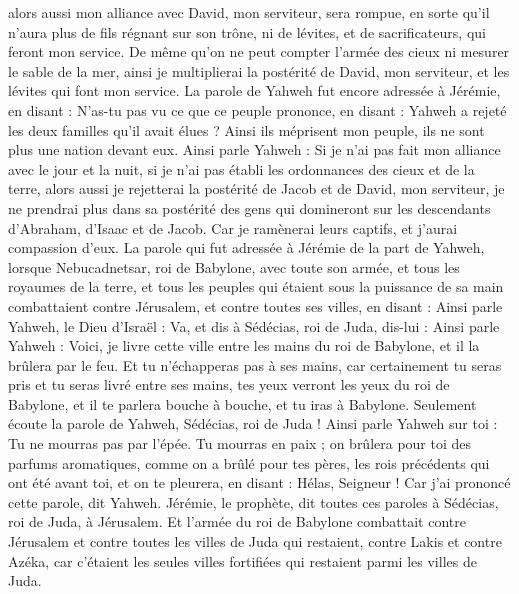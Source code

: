 \begin{multicols}{2}
alors aussi mon alliance avec David, mon serviteur, sera rompue, en sorte qu'il n'aura plus de fils régnant sur son trône, ni de lévites, et de sacrificateurs, qui feront mon service.
De même qu’on ne peut compter l'armée des cieux ni mesurer le sable de la mer, ainsi je multiplierai la postérité de David, mon serviteur, et les lévites qui font mon service.
La parole de Yahweh fut encore adressée à Jérémie, en disant :
N'as-tu pas vu ce que ce peuple prononce, en disant : Yahweh a rejeté les deux familles qu'il avait élues ? Ainsi ils méprisent mon peuple, ils ne sont plus une nation devant eux.
Ainsi parle Yahweh : Si je n'ai pas fait mon alliance avec le jour et la nuit, si je n'ai pas établi les ordonnances des cieux et de la terre,
alors aussi je rejetterai la postérité de Jacob et de David, mon serviteur, je ne prendrai plus dans sa postérité des gens qui domineront sur les descendants d'Abraham, d'Isaac et de Jacob. Car je ramènerai leurs captifs, et j'aurai compassion d'eux.
\VerseOne{}La parole qui fut adressée à Jérémie de la part de Yahweh, lorsque Nebucadnetsar, roi de Babylone, avec toute son armée, et tous les royaumes de la terre, et tous les peuples qui étaient sous la puissance de sa main combattaient contre Jérusalem, et contre toutes ses villes, en disant :
Ainsi parle Yahweh, le Dieu d'Israël : Va, et dis à Sédécias, roi de Juda, dis-lui : Ainsi parle Yahweh : Voici, je livre cette ville entre les mains du roi de Babylone, et il la brûlera par le feu.
Et tu n'échapperas pas à ses mains, car certainement tu seras pris et tu seras livré entre ses mains, tes yeux verront les yeux du roi de Babylone, et il te parlera bouche à bouche, et tu iras à Babylone.
Seulement écoute la parole de Yahweh, Sédécias, roi de Juda ! Ainsi parle Yahweh sur toi : Tu ne mourras pas par l'épée.
Tu mourras en paix ; on brûlera pour toi des parfums aromatiques, comme on a brûlé pour tes pères, les rois précédents qui ont été avant toi, et on te pleurera, en disant : Hélas, Seigneur ! Car j'ai prononcé cette parole, dit Yahweh.
Jérémie, le prophète, dit toutes ces paroles à Sédécias, roi de Juda, à Jérusalem.
Et l'armée du roi de Babylone combattait contre Jérusalem et contre toutes les villes de Juda qui restaient, contre Lakis et contre Azéka, car c'étaient les seules villes fortifiées qui restaient parmi les villes de Juda.

\end{multicols}
